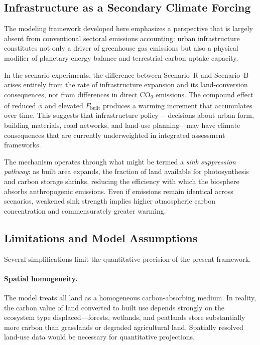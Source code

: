 \documentclass[12pt]{article}
\newcommand{\Fbuilt}{F_{\mathrm{built}}}
\begin{document}
\subsection{Infrastructure as a Secondary Climate Forcing}

The modeling framework developed here emphasizes a perspective that is largely
absent from conventional sectoral emissions accounting: urban infrastructure
constitutes not only a driver of greenhouse gas emissions but also a physical
modifier of planetary energy balance and terrestrial carbon uptake capacity.

In the scenario experiments, the difference between Scenario~R and Scenario~B
arises entirely from the rate of infrastructure expansion and its land-conversion
consequences, not from differences in direct CO\textsubscript{2} emissions.  The
compound effect of reduced $\phi$ and elevated $\Fbuilt$ produces a warming
increment that accumulates over time.  This suggests that infrastructure policy---
decisions about urban form, building materials, road networks, and land-use
planning---may have climate consequences that are currently underweighted in
integrated assessment frameworks.

The mechanism operates through what might be termed a \emph{sink suppression
pathway}: as built area expands, the fraction of land available for
photosynthesis and carbon storage shrinks, reducing the efficiency with which the
biosphere absorbs anthropogenic emissions.  Even if emissions remain identical
across scenarios, weakened sink strength implies higher atmospheric carbon
concentration and commensurately greater warming.

\subsection{Limitations and Model Assumptions}

Several simplifications limit the quantitative precision of the present framework.

\paragraph{Spatial homogeneity.}
The model treats all land as a homogeneous carbon-absorbing medium.  In reality,
the carbon value of land converted to built use depends strongly on the ecosystem
type displaced---forests, wetlands, and peatlands store substantially more carbon
than grasslands or degraded agricultural land.  Spatially resolved land-use data
would be necessary for quantitative projections.
\end{document}
